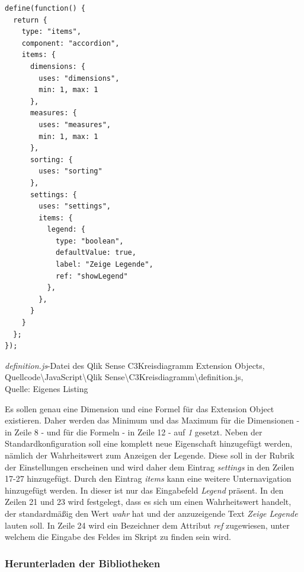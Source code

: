 \begin{listing}[htbp]
\begin{verbatim}
define(function() {
  return {
    type: "items",
    component: "accordion",
    items: {
      dimensions: {
        uses: "dimensions",
        min: 1, max: 1
      },
      measures: {
        uses: "measures",
        min: 1, max: 1
      },
      sorting: {
        uses: "sorting"
      },
      settings: {
        uses: "settings",
        items: {
          legend: {
            type: "boolean",
            defaultValue: true,
            label: "Zeige Legende",
            ref: "showLegend"            
          },
        },
      }
    }
  };
});
\end{verbatim}
\caption[\textit{definition.js}-Datei des Qlik Sense C3Kreisdiagramm Extension Objects]{\textit{definition.js}-Datei des Qlik Sense C3Kreisdiagramm Extension Objects, \\Quellcode\textbackslash{}JavaScript\textbackslash{}Qlik Sense\textbackslash{}C3Kreisdiagramm\textbackslash{}definition.js, \\Quelle: Eigenes Listing}
\label{lst:QlikSenseC3KreisdiagrammDefinitionJs}
\end{listing}

Es sollen genau eine Dimension und eine Formel für das Extension Object existieren. Daher werden das Minimum und das Maximum für die Dimensionen - in Zeile 8 - und für die Formeln - in Zeile 12 - auf \textit{1} gesetzt. Neben der Standardkonfiguration soll eine komplett neue Eigenschaft hinzugefügt werden, nämlich der Wahrheits\-wert zum Anzeigen der Legende. Diese soll in der Rubrik der Einstellungen erscheinen und wird daher dem Eintrag \textit{settings} in den Zeilen 17-27 hinzugefügt. Durch den Eintrag \textit{items} kann eine weitere Unternavigation hinzugefügt werden. In dieser ist nur das Eingabefeld \textit{Legend} präsent. In den Zeilen 21 und 23 wird festgelegt, dass es sich um einen Wahrheits\-wert handelt, der standardmäßig den Wert \textit{wahr} hat und der anzuzeigende Text \textit{Zeige Legende} lauten soll. In Zeile 24 wird ein Bezeichner dem Attribut \textit{ref} zugewiesen, unter welchem die Eingabe des Feldes im Skript zu finden sein wird.



\subsubsection{Herunterladen der Bibliotheken}
\label{lab:HerunterladenDerBibliothekenQlikSense} 


